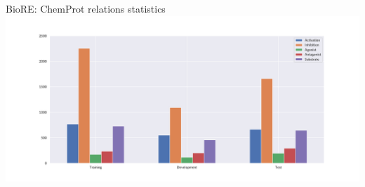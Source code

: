 \begin{frame}[t]{BioRE: ChemProt relations statistics}
\centering
\includegraphics[width=\textwidth,trim={36mm 14mm 40mm 20mm},clip]{img/chemprot-relations-statistics/v2/001.pdf}%
\end{frame}
